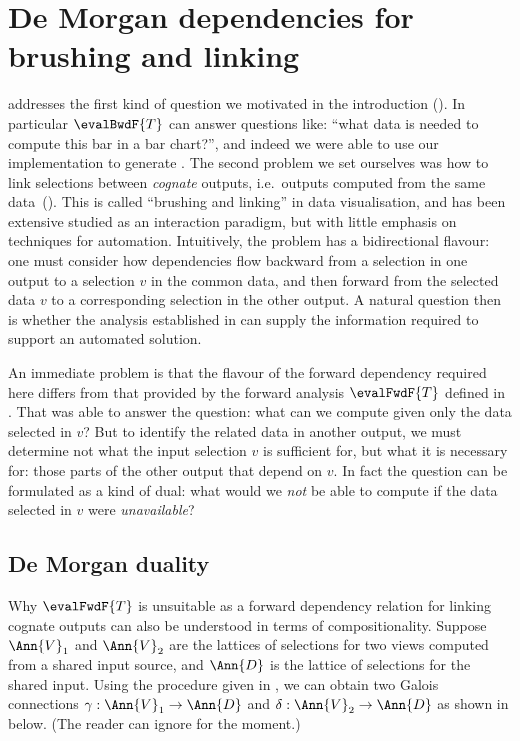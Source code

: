 \newpage
\section{De Morgan dependencies for brushing and linking}
\label{sec:de-morgan}

 addresses the first kind of question we motivated in the introduction (). In particular $\evalBwdF{T}$ can answer questions like: ``what data is needed to compute this bar in a bar chart?'', and indeed we were able to use our implementation to generate . The second problem we set ourselves was how to link selections between \emph{cognate} outputs, i.e.~outputs computed from the same data~(). This is called ``brushing and linking'' \cite{becker87} in data visualisation, and has been extensive studied as an interaction paradigm, but with little emphasis on techniques for automation. Intuitively, the problem has a bidirectional flavour: one must consider how dependencies flow backward from a selection in one output to a selection $v$ in the common data, and then forward from the selected data $v$ to a corresponding selection in the other output. A natural question then is whether the analysis established in  can supply the information required to support an automated solution.

An immediate problem is that the flavour of the forward dependency required here differs from that provided by the forward analysis $\evalFwdF{T}$ defined in . That was able to answer the question: what can we compute given only the data selected in $v$? But to identify the related data in another output, we must determine not what the input selection $v$ is sufficient for, but what it is necessary for: those parts of the other output that depend on $v$. In fact the question can be formulated as a kind of dual: what would we \emph{not} be able to compute if the data selected in $v$ were \emph{unavailable}?

\subsection{De Morgan duality}
\label{sec:de-morgan:de-morgan-duality}

Why $\evalFwdF{T}$ is unsuitable as a forward dependency relation for linking cognate outputs can also be understood in terms of compositionality. Suppose $\Ann{V}_1$ and $\Ann{V}_2$ are the lattices of selections for two views computed from a shared input source, and $\Ann{D}$ is the lattice of selections for the shared input. Using the procedure given in , we can obtain two Galois connections $\gamma: \Ann{V}_1 \to \Ann{D}$ and $\delta: \Ann{V}_2 \to \Ann{D}$ as shown in  below. (The reader can ignore  for the moment.)

